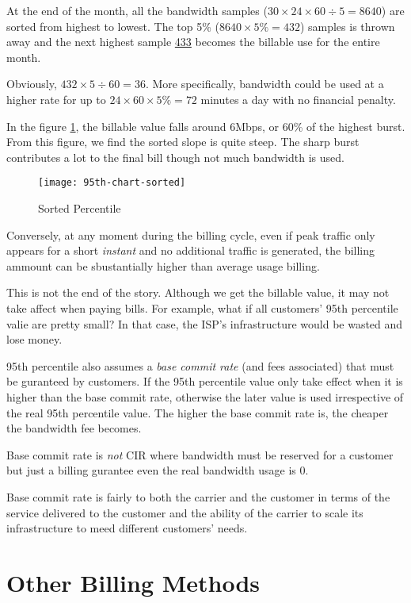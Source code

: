 At the end of the month, all the bandwidth samples
($30 \times 24 \times 60 \div 5 = 8640$) are sorted from highest
to lowest. The top 5\% ($8640 \times 5\% = 432$) samples is thrown
away and the next highest sample \uline{433} becomes the billable
use for the entire month.

Obviously, $432 \times 5 \div 60 = 36$. More specifically,
bandwidth could be used at a higher rate for up to
$24 \times 60 \times 5\% = 72$ minutes a day with no financial
penalty.

In the figure \ref{fig:sorted-95th-percentile}, the
billable value falls around 6Mbps, or 60\% of the highest
burst. From this figure, we find the sorted slope is quite
steep. The sharp burst contributes a lot to the final bill though
not much bandwidth is used.

\begin{figure}[!htbp]
  \centering
  \texttt{[image: 95th-chart-sorted]}
  \caption{Sorted Percentile}
  \label{fig:sorted-95th-percentile}
\end{figure}

Conversely, at any moment during the billing cycle, even if peak
traffic only appears for a short \textit{instant} and no
additional traffic is generated, the billing ammount can be
sbustantially higher than average usage billing.

This is not the end of the story. Although we get the billable
value, it may not take affect when paying bills. For example, what
if all customers' 95th percentile valie are pretty small? In that
case, the ISP's infrastructure would be wasted and lose money.

95th percentile also assumes a \textit{base commit rate} (and fees
associated) that must be guranteed by customers. If the 95th
percentile value only take effect when it is higher than the base
commit rate, otherwise the later value is used irrespective of the
real 95th percentile value. The higher the base commit rate is,
the cheaper the bandwidth fee becomes.

Base commit rate is \textit{not} CIR where bandwidth must be
reserved for a customer but just a billing gurantee even the real
bandwidth usage is 0.

Base commit rate is fairly to both the carrier and the customer in
terms of the service delivered to the customer and the ability of
the carrier to scale its infrastructure to meed different
customers' needs.

\section{Other Billing Methods}
\label{sec:other-billing-methods}


